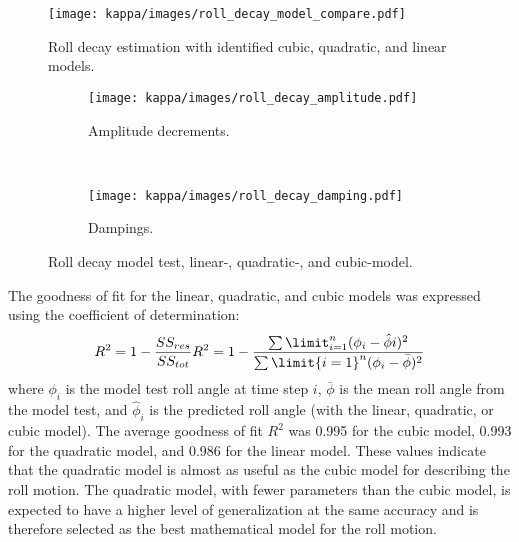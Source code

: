 \begin{figure}[h!] \centering \texttt{[image: kappa/images/roll\_decay\_model\_compare.pdf]} \caption{Roll decay estimation with identified cubic, quadratic, and linear models.} \label{fig:roll_decay_compare} \end{figure}

\begin{figure}[h!] \begin{subfigure}[b]{0.45\textwidth} \centering \texttt{[image: kappa/images/roll\_decay\_amplitude.pdf]} \caption{Amplitude decrements.} \label{fig:roll_decay_amplitude} \end{subfigure} ~ %
\begin{subfigure}[b]{0.45\textwidth} \centering \texttt{[image: kappa/images/roll\_decay\_damping.pdf]} \caption{Dampings.} \label{fig:roll_decay_damping} \end{subfigure} \caption{Roll decay model test, linear-, quadratic-, and cubic-model.} \label{fig:roll_decay} \end{figure}

The goodness of fit for the linear, quadratic, and cubic models was expressed using the coefficient of determination: 
\begin{equation} \label{eq:R2} 
R^2=1-\frac{SS_{res}}{SS_{tot}} R^2=1-\frac{\sum\limit_{i=1}^{n}(\phi_{i}-\hat{\phi}i)^2}{\sum\limit{i=1}^{n}(\phi_i-\bar \phi)^2} 
\end{equation} 
where $\phi_i$ is the model test roll angle at time step $i$, $\bar \phi$ is the mean roll angle from the model test, and $\hat{\phi}_i$ is the predicted roll angle (with the linear, quadratic, or cubic model). The average goodness of fit $R^2$ was 0.995 for the cubic model, 0.993 for the quadratic model, and 0.986 for the linear model. These values indicate that the quadratic model is almost as useful as the cubic model for describing the roll motion. The quadratic model, with fewer parameters than the cubic model, is expected to have a higher level of generalization at the same accuracy and is therefore selected as the best mathematical model for the roll motion.